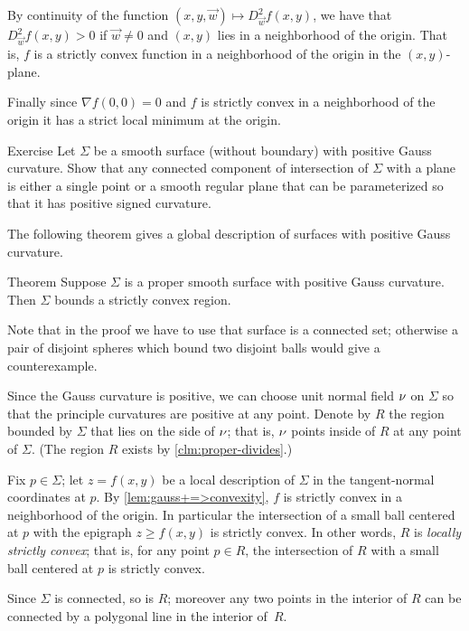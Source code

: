 By continuity of the function $(x,y,{\vec w})\mapsto D^2_{\vec w}f(x,y)$,
we have that $D^2_{\vec w}f(x,y)>0$ if $\vec w\ne 0$ and $(x,y)$ lies in a neighborhood of the origin.
That is, $f$ is a strictly convex function in a neighborhood of the origin in the $(x,y)$-plane.

Finally since $\nabla f(0,0)=0$ and $f$ is strictly convex in a neighborhood of the origin it has a strict local minimum at the origin.
\qeds

\begin{thm}{Exercise}
Let $\Sigma$ be a smooth surface (without boundary) with positive Gauss curvature.
Show that any connected component of intersection of $\Sigma$ with a plane is either a single point or a smooth regular plane that can be parameterized so that it has positive signed curvature.
\end{thm}

The following theorem gives a global description of surfaces with positive Gauss curvature.

\begin{thm}{Theorem}\label{thm:convex-embedded}
Suppose $\Sigma$ is a proper smooth surface with positive Gauss curvature.
Then $\Sigma$ bounds a strictly convex region.
\end{thm}

Note that in the proof we have to use that surface is a connected set;
otherwise a pair of disjoint spheres which bound two disjoint balls would give a counterexample.

Since the Gauss curvature is positive, we can choose unit normal field $\nu$ on $\Sigma$ so that the principle curvatures are positive at any point.
Denote by $R$ the region bounded by $\Sigma$ that lies on the side of $\nu$;
that is, $\nu$ points inside of $R$ at any point of $\Sigma$.
(The region $R$ exists by \ref{clm:proper-divides}.)

Fix $p\in\Sigma$; let $z=f(x,y)$ be a local description of $\Sigma$ in the tangent-normal coordinates at $p$.
By \ref{lem:gauss+=>convexity}, $f$ is strictly convex in a neighborhood of the origin.
In particular the intersection of a small ball centered at $p$ with the epigraph $z\ge f(x,y)$ is strictly convex.
In other words, $R$ is \emph{locally strictly convex};
that is, for any point $p\in R$, the intersection of $R$ with a small ball centered at $p$ is strictly convex.

Since $\Sigma$ is connected, so is $R$;
moreover any two points in the interior of $R$ can be connected by a polygonal line in the interior of~$R$.

